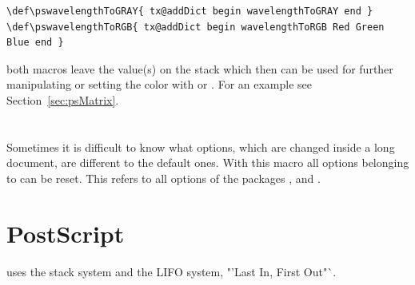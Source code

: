 \documentclass[11pt,english,BCOR=10mm,DIV=12,bibliography=totoc,parskip=false,headings=small,
    headinclude=false,footinclude=false,oneside]{pst-doc}
\begin{document}
\begin{lstlisting}
\def\pswavelengthToGRAY{ tx@addDict begin wavelengthToGRAY end }
\def\pswavelengthToRGB{ tx@addDict begin wavelengthToRGB Red Green Blue end }
\end{lstlisting}

both macros leave the value(s) on the stack which then can be used for further
manipulating or setting the color with  or . 
For an example see Section~\ref{sec:psMatrix}.




\appendix


\clearpage
\section{}

Sometimes it is difficult to know what options, which are changed
inside a long document, are different to the default ones. With
this macro all options belonging to  can be reset.
This refers to all options of the packages ,
 and .



\section{PostScript}

 uses the stack system and the LIFO system, "'Last In, First Out"`.
\end{document}
